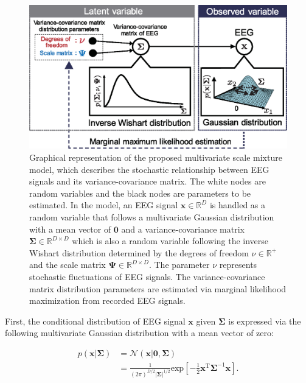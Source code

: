 \documentclass[journal]{IEEEtran}
\begin{document}
\begin{figure}[!t]
\centering
\includegraphics[width=1.0\hsize]{figure/fig1_ver2.eps}
\caption{Graphical representation of the proposed multivariate scale mixture model, which describes the stochastic relationship between EEG signals and its variance-covariance matrix.
The white nodes are random variables and the black nodes are parameters to be estimated.
In the model, an EEG signal $\mathbf{x} \in \mathbb{R}^{D}$ is handled as a random variable that follows a multivariate Gaussian distribution with a mean vector of $\mathbf{0}$ and a variance-covariance matrix $\mathbf{\Sigma} \in \mathbb{R}^{D \times D}$ which is also a random variable following the inverse Wishart distribution determined by the degrees of freedom $\nu \in \mathbb{R}^+$ and the scale matrix $\mathbf{\Psi} \in \mathbb{R}^{D \times D}$. The parameter $\nu$ represents stochastic fluctuations of EEG signals.
The variance-covariance matrix distribution parameters are estimated via marginal likelihood maximization from recorded EEG signals.}
\label{fig:model}
\end{figure}
First, the conditional distribution of EEG signal $\mathbf{x}$ given $\mathbf{\Sigma}$ is expressed via the following multivariate Gaussian distribution with a mean vector of zero:

\begin{align}
	p(\mathbf{x}|{\mathbf{\Sigma}}) &= {\mathcal N}(\mathbf{x}|\mathbf{0}, {\mathbf{\Sigma}}) \nonumber\\
&= \frac{1}{(2\pi)^{D/2} |\mathbf{\Sigma}|^{1/2}} \mathrm{exp} \left[-\frac{1}{2}\mathbf{x}^\mathrm{T} {\mathbf{\Sigma}}^{-1} \mathbf{x}\right]. \label{eq:gauss_x} %
\end{align}
\end{document}
